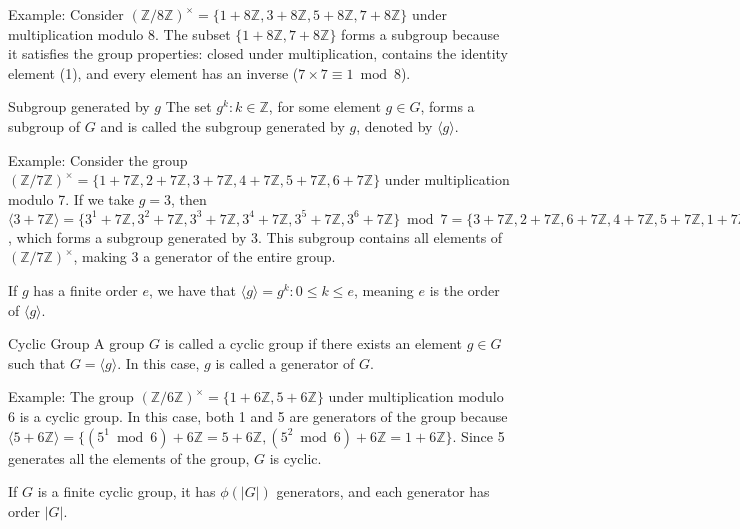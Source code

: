 \documentclass{article}
\begin{document}
Example: Consider $(\mathbb{Z}/8\mathbb{Z})^{\times} = \{1 + 8\mathbb{Z}, 3+ 8\mathbb{Z}, 5+ 8\mathbb{Z}, 7+ 8\mathbb{Z}\}$ under multiplication modulo 8. The subset $\{1+ 8\mathbb{Z}, 7+ 8\mathbb{Z}\}$ forms a subgroup because it satisfies the group properties: closed under multiplication, contains the identity element (1), and every element has an inverse ($7 \times 7 \equiv 1 \bmod 8$).

\begin{definition}{Subgroup generated by $g$}{} The set ${g^{k} : k \in \mathbb{Z}}$, for some element $g \in G$, forms a subgroup of $G$ and is called the subgroup generated by $g$, denoted by $\langle g \rangle$. \end{definition}

Example: Consider the group $(\mathbb{Z}/7\mathbb{Z})^{\times} = \{1+ 7\mathbb{Z}, 2+ 7\mathbb{Z}, 3+ 7\mathbb{Z}, 4+ 7\mathbb{Z}, 5+ 7\mathbb{Z}, 6+ 7\mathbb{Z}\}$ under multiplication modulo 7. If we take $g = 3$, then $\langle 3 +7\mathbb{Z} \rangle = \{3^1+7\mathbb{Z}, 3^2+7\mathbb{Z}, 3^3+7\mathbb{Z}, 3^4+7\mathbb{Z}, 3^5+7\mathbb{Z}, 3^6+7\mathbb{Z}\} \bmod 7 = \{3+7\mathbb{Z}, 2+7\mathbb{Z}, 6+7\mathbb{Z}, 4+7\mathbb{Z}, 5+7\mathbb{Z}, 1+7\mathbb{Z}\}$, which forms a subgroup generated by 3. This subgroup contains all elements of $(\mathbb{Z}/7\mathbb{Z})^{\times}$, making 3 a generator of the entire group.

If $g$ has a finite order $e$, we have that $\langle g \rangle = {g^{k}: 0 \leq k \leq e}$, meaning $e$ is the order of $\langle g \rangle$.

\begin{definition}{Cyclic Group}{} A group $G$ is called a cyclic group if there exists an element $g \in G$ such that $G = \langle g \rangle$. In this case, $g$ is called a generator of $G$. \end{definition}

Example: The group $(\mathbb{Z}/6\mathbb{Z})^{\times} = \{1+6\mathbb{Z}, 5+6\mathbb{Z}\}$ under multiplication modulo 6 is a cyclic group. In this case, both 1 and 5 are generators of the group because $\langle 5 +6\mathbb{Z} \rangle = \{(5^1 \bmod 6)+6\mathbb{Z} = 5 +6\mathbb{Z}, (5^2 \bmod 6)+6\mathbb{Z} = 1+6\mathbb{Z}\}$. Since 5 generates all the elements of the group, $G$ is cyclic.

\begin{theorem}{}{} If $G$ is a finite cyclic group, it has $\phi(|G|)$ generators, and each generator has order $|G|$. \end{theorem}
\end{document}
